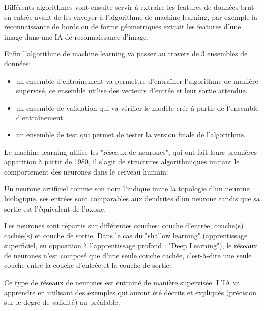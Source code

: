             Différents algorithmes vont ensuite servir à extraire les features de données
            brut en entrée avant de les envoyer à l'algorithme de machine learning, par exemple
            la reconnaissance de bords ou de forme géometriques extrait les features d'une
            image dans une IA de reconnaissance d'image. \newline

            Enfin l'algorithme de machine learning va passer au travers de 3 ensembles de données:
            \begin{itemize}
                \item un ensemble d'entraînement va permettre d'entraîner l'algorithme de manière
                supervisé, ce ensemble utilise des vecteurs d'entrée et leur sortie attendue.
                \item un ensemble de validation qui va vérifier le modèle crée à partir de l'ensemble
                d'entraînement.
                \item un ensemble de test qui permet de tester la version finale de l'algorithme.
                \newline
            \end{itemize}

            Le machine learning utilise les "réseaux de neurones", qui ont fait leurs premières
            apparition à partir de 1980, il s'agit de structures algorithmiques imitant
            le comportement des neurones dans le cerveau humain:


            Un neurone artificiel comme son nom l'indique imite la topologie d'un neurone biologique,
            ses entrées sont comparables aux dendrites d'un neurone tandis que sa
            sortie est l'équivalent de l'axone. \newline

            Les neurones sont répartis sur différentes couches: couche d'entrée, couche(s) cachée(s)
            et couche de sortie. Dans le cas du "shallow learning" (apprentissage superficiel,
            en opposition à l'apprentissage profond : "Deep Learning"), le réseaux de neurones
            n'est composé que d'une seule couche cachée, c'est-à-dire une seule couche entre
            la couche d'entrée et la couche de sortie:


            Ce type de réseaux de neurones est entrainé de manière supervisée.
            L'IA va apprendre en utilisant des exemples qui auront été décrits
            et expliqués (précision sur le degré de validité) au préalable.

